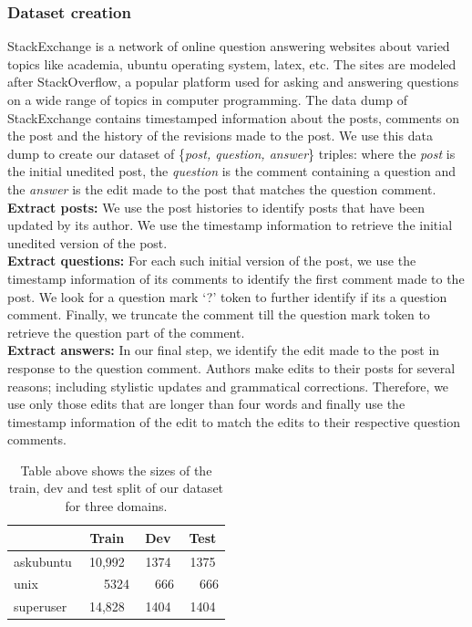 \documentclass[11pt]{article}
\begin{document}
\subsubsection{Dataset creation}\label{dataset_creation}
StackExchange is a network of online question answering websites about varied topics like academia, ubuntu operating system, latex, etc. The sites are modeled after StackOverflow, a popular platform used for asking and answering questions on a wide range of topics in computer programming. The data dump of StackExchange contains timestamped information about the posts, comments on the post and the history of the revisions made to the post. We use this data dump to create our dataset of \{\textit{post, question, answer}\} triples: where the \textit{post} is the initial unedited post, the \textit{question} is the comment containing a question and the \textit{answer} is the edit made to the post that matches the question comment. \\
\textbf{Extract posts:} We use the post histories to identify posts that have been updated by its author. We use the timestamp information to retrieve the initial unedited version of the post.\\
\textbf{Extract questions:} For each such initial version of the post, we use the timestamp information of its comments to identify the first comment made to the post. We look for a question mark `?' token to further identify if its a question comment. Finally, we truncate the comment till the question mark token to retrieve the question part of the comment.\\
\textbf{Extract answers:} In our final step, we identify the edit made to the post in response to the question comment. Authors make edits to their posts for several reasons; including stylistic updates and grammatical corrections. Therefore, we use only those edits that are longer than four words and finally use the timestamp information of the edit to match the edits to their respective question comments.

\begin{table}
\centering
\begin{tabular}{lccc}
\toprule
& Train & Dev & Test  \\
\midrule
askubuntu & 10,992 & 1374 & 1375\\
unix & ~~~5324 & ~~666 & ~~666 \\
superuser & 14,828 & 1404 & 1404 \\
\bottomrule
\end{tabular}
\label{data_statistics}
\caption{Table above shows the sizes of the train, dev and test split of our dataset for three domains.}
\end{table}
\end{document}
